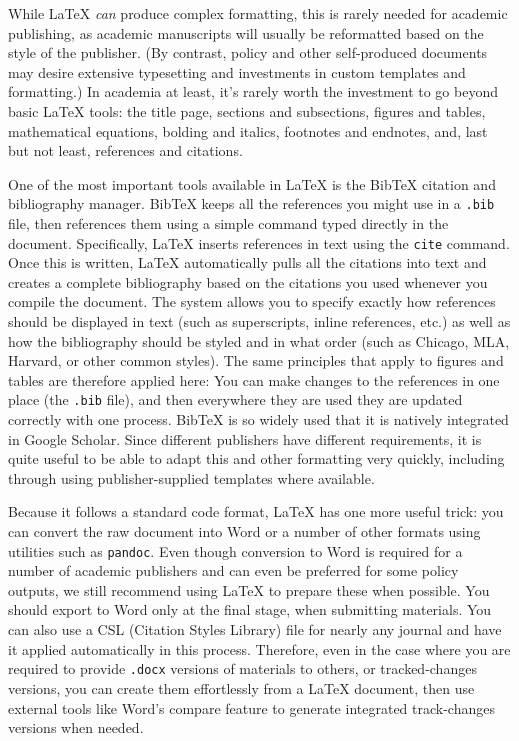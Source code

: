 While {\LaTeX} \textit{can} produce complex formatting,
this is rarely needed for academic publishing,
as academic manuscripts will usually be reformatted
based on the style of the publisher.
(By contrast, policy and other self-produced documents may desire
extensive typesetting and investments in custom templates and formatting.)
In academia at least,
it's rarely worth the investment to go beyond basic {\LaTeX} tools:
the title page, sections and subsections,
figures and tables, mathematical equations,
bolding and italics, footnotes and endnotes,
and, last but not least, references and citations.

One of the most important tools available in {\LaTeX}
is the BibTeX citation and bibliography manager.
BibTeX keeps all the references you might use in a \texttt{.bib} file,
then references them using a simple command typed directly in the document.
Specifically, {\LaTeX} inserts references in text using the \texttt{cite} command.
Once this is written, {\LaTeX} automatically pulls all the citations into text
and creates a complete bibliography based on the citations you used whenever you compile the document.
The system allows you to specify exactly how references should be displayed in text
(such as superscripts, inline references, etc.)
as well as how the bibliography should be styled and in what order
(such as Chicago, MLA, Harvard, or other common styles).
The same principles that apply to figures and tables are therefore applied here:
You can make changes to the references in one place (the \texttt{.bib} file),
and then everywhere they are used they are updated correctly with one process.
BibTeX is so widely used that it is natively integrated in Google Scholar.
Since different publishers have different requirements,
it is quite useful to be able to adapt this and other formatting very quickly,
including through using publisher-supplied templates where available.

Because it follows a standard code format,
{\LaTeX} has one more useful trick:
you can convert the raw document into Word
or a number of other formats
using utilities such as \texttt{pandoc}.
Even though conversion to Word is required
for a number of academic publishers and can even be preferred for some policy outputs,
we still recommend using {\LaTeX} to prepare these when possible.
You should export to Word only at the final stage, when submitting materials.
You can also use a CSL (Citation Styles Library) file
for nearly any journal and have it applied automatically in this process.
Therefore, even in the case where you are required to provide
\texttt{.docx} versions of materials to others, or tracked-changes versions,
you can create them effortlessly from a {\LaTeX} document,
then use external tools like Word's compare feature
to generate integrated track-changes versions when needed.

